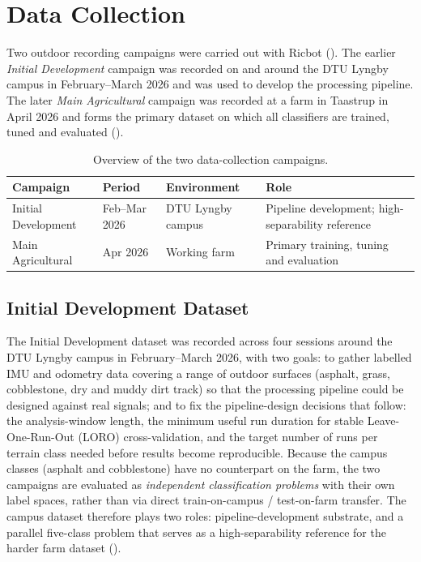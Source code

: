 \chapter{Data Collection}
\label{ch:collection}

Two outdoor recording campaigns were carried out with Ricbot (). The earlier \emph{Initial Development} campaign was recorded on and around the DTU Lyngby campus in February–March 2026 and was used to develop the processing pipeline. The later \emph{Main Agricultural} campaign was recorded at a farm in Taastrup in April 2026 and forms the primary dataset on which all classifiers are trained, tuned and evaluated ().

\begin{table}[H]
\centering
\caption{Overview of the two data-collection campaigns.}
\label{tab:campaigns}
\begin{tabular}{lllp{4cm}}
\toprule
\textbf{Campaign} & \textbf{Period} & \textbf{Environment} & \textbf{Role} \\
\midrule
Initial Development & Feb–Mar 2026 & DTU Lyngby campus & Pipeline development; high-separability reference \\ 
Main Agricultural   & Apr 2026     & Working farm      & Primary training, tuning and evaluation \\
\bottomrule
\end{tabular}
\end{table}

\section{Initial Development Dataset}
\label{sec:initial_dev_dataset}

The Initial Development dataset was recorded across four sessions around the DTU Lyngby campus in February–March 2026, with two goals: to gather labelled IMU and odometry data covering a range of outdoor surfaces (asphalt, grass, cobblestone, dry and muddy dirt track) so that the processing pipeline could be designed against real signals; and to fix the pipeline-design decisions that follow: the analysis-window length, the minimum useful run duration for stable Leave-One-Run-Out (LORO) cross-validation, and the target number of runs per terrain class needed before results become reproducible. Because the campus classes (asphalt and cobblestone) have no counterpart on the farm, the two campaigns are evaluated as \emph{independent classification problems} with their own label spaces, rather than via direct train-on-campus / test-on-farm transfer. The campus dataset therefore plays two roles: pipeline-development substrate, and a parallel five-class problem that serves as a high-separability reference for the harder farm dataset ().

